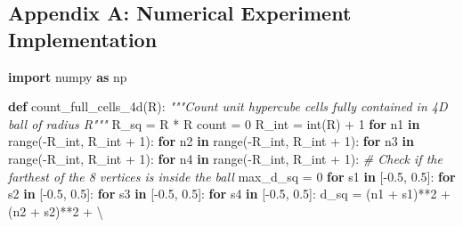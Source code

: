 \documentclass[
]{article}
\newenvironment{Shaded}{}{}
\newcommand{\BuiltInTok}[1]{\textcolor[rgb]{0.00,0.50,0.00}{#1}}
\newcommand{\CommentTok}[1]{\textcolor[rgb]{0.38,0.63,0.69}{\textit{#1}}}
\newcommand{\ControlFlowTok}[1]{\textcolor[rgb]{0.00,0.44,0.13}{\textbf{#1}}}
\newcommand{\DecValTok}[1]{\textcolor[rgb]{0.25,0.63,0.44}{#1}}
\newcommand{\FloatTok}[1]{\textcolor[rgb]{0.25,0.63,0.44}{#1}}
\newcommand{\ImportTok}[1]{\textcolor[rgb]{0.00,0.50,0.00}{\textbf{#1}}}
\newcommand{\KeywordTok}[1]{\textcolor[rgb]{0.00,0.44,0.13}{\textbf{#1}}}
\newcommand{\NormalTok}[1]{#1}
\newcommand{\OperatorTok}[1]{\textcolor[rgb]{0.40,0.40,0.40}{#1}}
\begin{document}
\subsection{Appendix A: Numerical Experiment
Implementation}\label{appendix-a-numerical-experiment-implementation}

\begin{Shaded}
\begin{Highlighting}[]
\ImportTok{import}\NormalTok{ numpy }\ImportTok{as}\NormalTok{ np}

\KeywordTok{def}\NormalTok{ count\_full\_cells\_4d(R):}
    \CommentTok{"""Count unit hypercube cells fully contained in 4D ball of radius R"""}
\NormalTok{    R\_sq }\OperatorTok{=}\NormalTok{ R }\OperatorTok{*}\NormalTok{ R}
\NormalTok{    count }\OperatorTok{=} \DecValTok{0}
\NormalTok{    R\_int }\OperatorTok{=} \BuiltInTok{int}\NormalTok{(R) }\OperatorTok{+} \DecValTok{1}
    \ControlFlowTok{for}\NormalTok{ n1 }\KeywordTok{in} \BuiltInTok{range}\NormalTok{(}\OperatorTok{{-}}\NormalTok{R\_int, R\_int }\OperatorTok{+} \DecValTok{1}\NormalTok{):}
        \ControlFlowTok{for}\NormalTok{ n2 }\KeywordTok{in} \BuiltInTok{range}\NormalTok{(}\OperatorTok{{-}}\NormalTok{R\_int, R\_int }\OperatorTok{+} \DecValTok{1}\NormalTok{):}
            \ControlFlowTok{for}\NormalTok{ n3 }\KeywordTok{in} \BuiltInTok{range}\NormalTok{(}\OperatorTok{{-}}\NormalTok{R\_int, R\_int }\OperatorTok{+} \DecValTok{1}\NormalTok{):}
                \ControlFlowTok{for}\NormalTok{ n4 }\KeywordTok{in} \BuiltInTok{range}\NormalTok{(}\OperatorTok{{-}}\NormalTok{R\_int, R\_int }\OperatorTok{+} \DecValTok{1}\NormalTok{):}
                    \CommentTok{\# Check if the farthest of the 8 vertices is inside the ball}
\NormalTok{                    max\_d\_sq }\OperatorTok{=} \DecValTok{0}
                    \ControlFlowTok{for}\NormalTok{ s1 }\KeywordTok{in}\NormalTok{ [}\OperatorTok{{-}}\FloatTok{0.5}\NormalTok{, }\FloatTok{0.5}\NormalTok{]:}
                        \ControlFlowTok{for}\NormalTok{ s2 }\KeywordTok{in}\NormalTok{ [}\OperatorTok{{-}}\FloatTok{0.5}\NormalTok{, }\FloatTok{0.5}\NormalTok{]:}
                            \ControlFlowTok{for}\NormalTok{ s3 }\KeywordTok{in}\NormalTok{ [}\OperatorTok{{-}}\FloatTok{0.5}\NormalTok{, }\FloatTok{0.5}\NormalTok{]:}
                                \ControlFlowTok{for}\NormalTok{ s4 }\KeywordTok{in}\NormalTok{ [}\OperatorTok{{-}}\FloatTok{0.5}\NormalTok{, }\FloatTok{0.5}\NormalTok{]:}
\NormalTok{                                    d\_sq }\OperatorTok{=}\NormalTok{ (n1 }\OperatorTok{+}\NormalTok{ s1)}\OperatorTok{**}\DecValTok{2} \OperatorTok{+}\NormalTok{ (n2 }\OperatorTok{+}\NormalTok{ s2)}\OperatorTok{**}\DecValTok{2} \OperatorTok{+} \OperatorTok{\textbackslash{}}

\end{Highlighting}
\end{Shaded}
\end{document}

